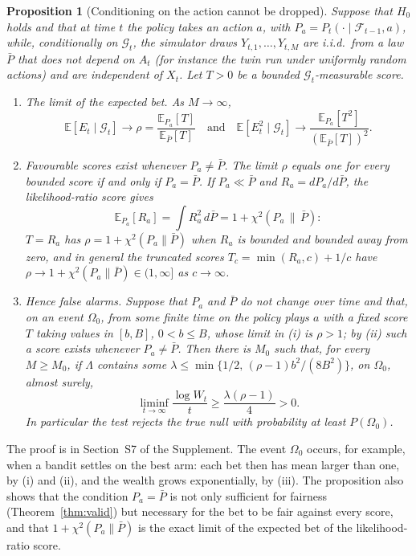 \documentclass[12pt]{article}
\newcommand{\E}{\mathbb{E}}
\newcommand{\F}{\mathcal{F}}
\newcommand{\G}{\mathcal{G}}
\newtheorem{proposition}{Proposition}
\theoremstyle{remark}
\begin{document}
\begin{proposition}[Conditioning on the action cannot be dropped]\label{prop:necessary}
Suppose that $H_0$ holds and that at time $t$ the policy takes an action $a$,
with $P_a = P_t(\cdot \mid \F_{t-1}, a)$, while, conditionally on $\G_t$, the
simulator draws $Y_{t,1}, \ldots, Y_{t,M}$ are i.i.d.\ from a law $\bar P$
that does not depend on $A_t$ (for instance the twin run under uniformly
random actions) and are independent of $X_t$. Let $T > 0$ be a bounded
$\G_t$-measurable score.
\begin{enumerate}
\item[(i)] \emph{The limit of the expected bet.} As $M \to \infty$,
\[
\E[E_t \mid \G_t] \to \rho = \frac{\E_{P_a}[T]}{\E_{\bar P}[T]}
\quad\text{and}\quad
\E[E_t^2 \mid \G_t] \to \frac{\E_{P_a}[T^2]}{(\E_{\bar P}[T])^2}.
\]
\item[(ii)] \emph{Favourable scores exist whenever $P_a \ne \bar P$.} The
limit $\rho$ equals one for every bounded score if and only if $P_a = \bar P$.
If $P_a \ll \bar P$ and $R_a = dP_a/d\bar P$, the likelihood-ratio score
gives
\[
\E_{P_a}[R_a] = \int R_a^2\, d\bar P = 1 + \chi^2(P_a \,\|\, \bar P):
\]
$T = R_a$ has $\rho = 1 + \chi^2(P_a\|\bar P)$ when $R_a$ is bounded and
bounded away from zero, and in general the truncated scores
$T_c = \min(R_a, c) + 1/c$ have $\rho \to 1 + \chi^2(P_a\|\bar P) \in (1,\infty]$
as $c \to \infty$.
\item[(iii)] \emph{Hence false alarms.} Suppose that $P_a$ and $\bar P$ do not
change over time and that, on an event $\Omega_0$, from some finite time on
the policy plays $a$ with a fixed score $T$ taking values in $[b, B]$,
$0 < b \le B$, whose limit in (i) is $\rho > 1$; by (ii) such a score exists
whenever $P_a \ne \bar P$. Then there is $M_0$ such that, for every
$M \ge M_0$, if $\Lambda$ contains some
$\lambda \le \min\{1/2,\, (\rho - 1)b^2/(8B^2)\}$, on $\Omega_0$, almost
surely,
\[
\liminf_{t\to\infty} \frac{\log W_t}{t} \ge \frac{\lambda(\rho - 1)}{4} > 0 .
\]
In particular the test rejects the true null with probability at least
$P(\Omega_0)$.
\end{enumerate}
\end{proposition}

The proof is in Section~S7 of the Supplement. The event $\Omega_0$ occurs, for
example, when a bandit settles on the best arm: each bet then has mean larger
than one, by (i) and (ii), and the wealth grows exponentially, by (iii). The
proposition also shows that the condition $P_a = \bar P$ is not only
sufficient for fairness (Theorem~\ref{thm:valid}) but necessary for the bet to
be fair against every score, and that $1 + \chi^2(P_a\|\bar P)$ is the exact
limit of the expected bet of the likelihood-ratio score.
\end{document}
